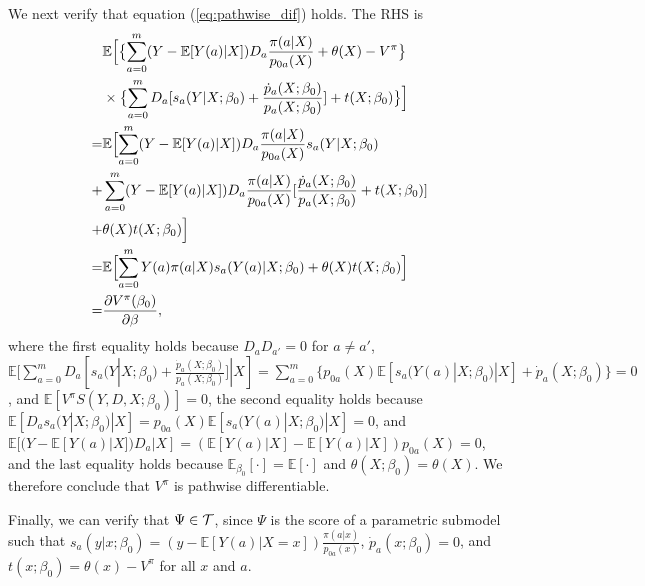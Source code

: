 \documentclass[letterpaper]{article} \usepackage{aaai19}  \usepackage{times}  \usepackage{helvet}  \usepackage{courier}  \usepackage{url}  \usepackage{graphicx}  \frenchspacing  \usepackage{comment}
\begin{document}
We next verify that equation (\ref{eq:pathwise_dif}) holds.
The RHS is
\begin{align*}
	&\mathbb{E}\Bigl[\bigl\{\sum_{a=0}^m(Y-\mathbb{E}[Y(a)|X])D_a\frac{\pi(a|X)}{p_{0a}(X)}+\theta(X)-V^\pi\bigr\}\\
	&\times \bigl\{\sum_{a=0}^m D_a [s_a(Y|X;\beta_0)+\frac{\dot p_a(X;\beta_0)}{p_a(X;\beta_0)}] + t(X;\beta_0)\bigr\}\Bigr]\\
	=&\mathbb{E}\Bigl[\sum_{a=0}^m(Y-\mathbb{E}[Y(a)|X])D_a\frac{\pi(a|X)}{p_{0a}(X)}s_a(Y|X;\beta_0)\\
	+&\sum_{a=0}^m(Y-\mathbb{E}[Y(a)|X])D_a\frac{\pi(a|X)}{p_{0a}(X)}[\frac{\dot p_a(X;\beta_0)}{p_a(X;\beta_0)}+t(X;\beta_0)]\\
	+&\theta(X) t(X;\beta_0)\Bigr]\\
	=&\mathbb{E}\Bigl[\sum_{a=0}^mY(a)\pi(a|X)s_a(Y(a)|X;\beta_0)+\theta(X) t(X;\beta_0)\Bigr]\\
	=&\frac{\partial V^\pi(\beta_0)}{\partial \beta},
\end{align*}
where the first equality holds because $D_aD_{a'}=0$ for $a\neq a'$, $\mathbb{E}[\sum_{a=0}^m D_a [s_a(Y|X;\beta_0)+\frac{\dot p_a(X;\beta_0)}{p_a(X;\beta_0)}]|X]=\sum_{a=0}^m \{p_{0a}(X)\mathbb{E}[s_a(Y(a)|X;\beta_0)|X]+\dot p_a(X;\beta_0)\}=0$, and $\mathbb{E}[V^\pi S(Y,D,X;\beta_0)]=0$, the second equality holds because $\mathbb{E}[D_a s_a(Y|X;\beta_0)|X]=p_{0a}(X)\mathbb{E}[s_a(Y(a)|X;\beta_0)|X]=0$, and $\mathbb{E}[(Y-\mathbb{E}[Y(a)|X])D_a|X]=(\mathbb{E}[Y(a)|X]-\mathbb{E}[Y(a)|X])p_{0a}(X)=0$, and the last equality holds because $\mathbb{E}_{\beta_0}[\cdot]=\mathbb{E}[\cdot]$ and $\theta(X;\beta_0)=\theta(X)$.
We therefore conclude that $V^\pi$ is pathwise differentiable.

Finally, we can verify that $\Psi\in \cal{T}$, since $\Psi$ is the score of a parametric submodel such that $s_a(y|x;\beta_0)= (y-\mathbb{E}[Y(a)|X=x])\frac{\pi(a|x)}{p_{0a}(x)}$, $\dot p_a(x;\beta_0)=0$, and $t(x;\beta_0)=\theta(x)-V^\pi$ for all $x$ and $a$.
\end{document}
